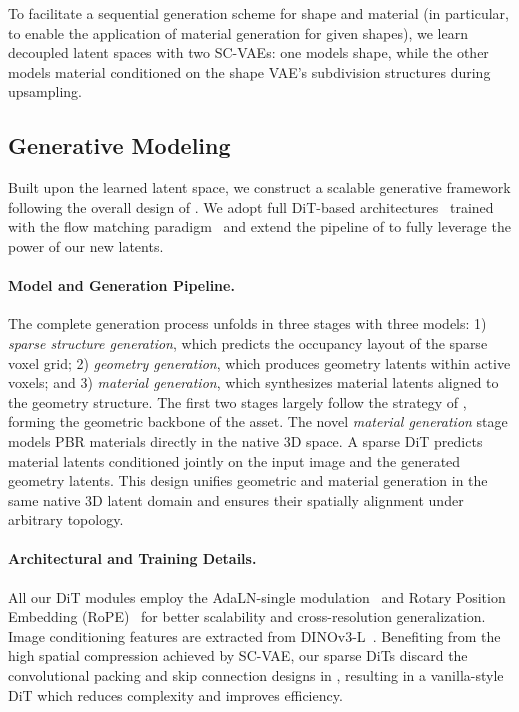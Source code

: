 \documentclass[10pt,twocolumn,letterpaper]{article}
\newcommand{\paravspace}{\vspace{-11pt}}
\begin{document}
To facilitate a sequential generation scheme for shape and material (in particular, to enable the application of material generation for given shapes), we learn decoupled latent spaces with two SC-VAEs: one models shape, while the other models material conditioned on the shape VAE's subdivision structures during upsampling.


\subsection{Generative Modeling}\label{sec:gen}

Built upon the learned latent space, we construct a scalable generative framework following the overall design of \cite{xiang2025structured}.
We adopt full DiT-based architectures~\cite{peebles2023scalable} trained with the flow matching paradigm~\cite{lipman2023flow} and extend the pipeline of \cite{xiang2025structured} to fully leverage the power of our new latents.

\paravspace
\paragraph{Model and Generation Pipeline.}
The complete generation process unfolds in three stages with three models:
1) \emph{sparse structure generation}, which predicts the occupancy layout of the sparse voxel grid;
2) \emph{geometry generation}, which produces geometry latents within active voxels; and
3) \emph{material generation}, which synthesizes material latents aligned to the geometry structure.
The first two stages largely follow the strategy of \cite{xiang2025structured}, forming the geometric backbone of the asset.
The novel \emph{material generation} stage models PBR materials directly in the native 3D space.
A sparse DiT predicts material latents conditioned jointly on the input image and the generated geometry latents.
This design unifies geometric and material generation in the same native 3D latent domain and ensures their spatially alignment under arbitrary topology.

\paravspace
\paragraph{Architectural and Training Details.}
All our DiT modules employ the AdaLN-single modulation~\cite{chen2024pixart} and Rotary Position Embedding (RoPE)~\cite{su2024roformer} for better scalability and cross-resolution generalization.
Image conditioning features are extracted from DINOv3-L~\cite{simeoni2025dinov3}.
Benefiting from the high spatial compression achieved by SC-VAE, our sparse DiTs discard the convolutional packing and skip connection designs in \cite{xiang2025structured}, resulting in a vanilla-style DiT which reduces complexity and improves efficiency.
\end{document}
